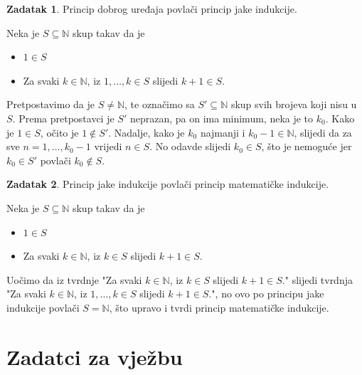 \documentclass{book}
\renewenvironment{proof}{%
    \vspace{-\parskip}\begin{oldproof}%
    }{%
    \end{oldproof}%
}
\theoremstyle{definition}
\theoremstyle{definition}
\newtheorem{exercise}{Zadatak}
\theoremstyle{remark}
\begin{document}
\begin{exercise}
Princip dobrog uređaja povlači princip jake indukcije.
\end{exercise}
\begin{proof}[Rješenje]
Neka je $S\subseteq \mathbb{N}$ skup takav da je
\begin{itemize}
\item $1\in S$
\item Za svaki $k\in \mathbb{N}$, iz $1, \dots, k\in S$ slijedi $k+1\in S$.
\end{itemize}
Pretpostavimo da je $S\neq \mathbb{N}$, te označimo sa $S'\subseteq \mathbb{N}$ skup svih brojeva koji nisu u $S$. Prema pretpostavci je $S'$ neprazan, pa on ima minimum, neka je to $k_0$. Kako je $1\in S$, očito je $1\notin S'$. Nadalje, kako je $k_0$ najmanji i $k_0-1\in \mathbb{N}$, slijedi da za sve $n=1,\dots, k_0-1$ vrijedi $n\in S$. No odavde slijedi $k_0\in S$, što je nemoguće jer $k_0\in S'$ povlači $k_0\notin S$.
\end{proof}
\begin{exercise}
Princip jake indukcije povlači princip matematičke indukcije.
\end{exercise}
\begin{proof}[Rješenje]
Neka je $S\subseteq \mathbb{N}$ skup takav da je
\begin{itemize}
\item $1\in S$
\item Za svaki $k\in \mathbb{N}$, iz $k\in S$ slijedi $k+1\in S$.
\end{itemize}
Uočimo da iz tvrdnje "Za svaki $k\in \mathbb{N}$, iz $k\in S$ slijedi $k+1\in S$." slijedi tvrdnja "Za svaki $k\in \mathbb{N}$, iz $1, \dots, k\in S$ slijedi $k+1\in S$.", no ovo po principu jake indukcije povlači $S=\mathbb{N}$, što upravo i tvrdi princip matematičke indukcije.
\end{proof}
\newpage
\section*{Zadatci za vježbu}
\end{document}
